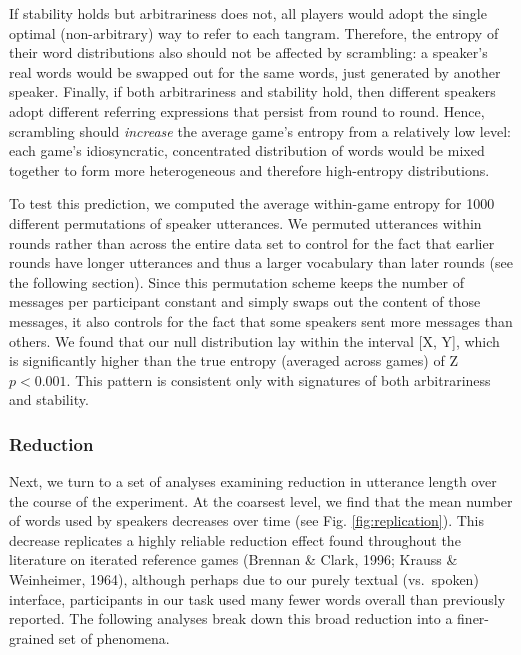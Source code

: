 \documentclass[alpha-refs]{wiley-article}
\begin{document}
If stability holds but arbitrariness does not, all players would adopt
the single optimal (non-arbitrary) way to refer to each tangram.
Therefore, the entropy of their word distributions also should not be
affected by scrambling: a speaker's real words would be swapped out for
the same words, just generated by another speaker. Finally, if both
arbitrariness and stability hold, then different speakers adopt
different referring expressions that persist from round to round. Hence,
scrambling should \emph{increase} the average game's entropy from a
relatively low level: each game's idiosyncratic, concentrated
distribution of words would be mixed together to form more heterogeneous
and therefore high-entropy distributions.

To test this prediction, we computed the average within-game entropy for
1000 different permutations of speaker utterances. We permuted
utterances within rounds rather than across the entire data set to
control for the fact that earlier rounds have longer utterances and thus
a larger vocabulary than later rounds (see the following section). Since
this permutation scheme keeps the number of messages per participant
constant and simply swaps out the content of those messages, it also
controls for the fact that some speakers sent more messages than others.
We found that our null distribution lay within the interval {[}X, Y{]},
which is significantly higher than the true entropy (averaged across
games) of Z \(p < 0.001\). This pattern is consistent only with
signatures of both arbitrariness and stability.

\subsubsection{Reduction}\label{reduction}

Next, we turn to a set of analyses examining reduction in utterance
length over the course of the experiment. At the coarsest level, we find
that the mean number of words used by speakers decreases over time (see
Fig. \ref{fig:replication}). This decrease replicates a highly reliable
reduction effect found throughout the literature on iterated reference
games (Brennan \& Clark, 1996; Krauss \& Weinheimer, 1964), although
perhaps due to our purely textual (vs.~spoken) interface, participants
in our task used many fewer words overall than previously reported. The
following analyses break down this broad reduction into a finer-grained
set of phenomena.
\end{document}
